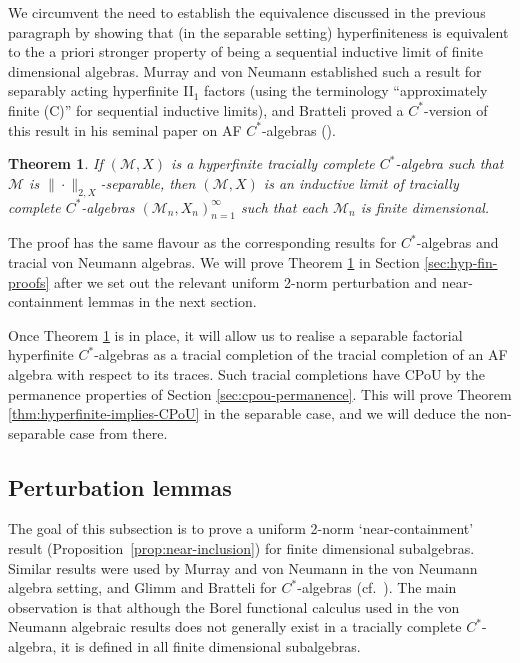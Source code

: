 \documentclass[a4paper,11pt]{amsart}
\newtheorem{theorem}{Theorem}
\theoremstyle{definition}
\numberwithin{equation}{section}
\numberwithin{theorem}{section}
\newcommand{\M}{\mathcal{M}}
\begin{document}
	We circumvent the need to establish the equivalence discussed in the previous paragraph by showing that (in the separable setting) hyperfiniteness is equivalent to the a priori stronger property of being a sequential inductive limit of finite dimensional algebras.  Murray and von Neumann established such a result for separably acting hyperfinite II$_1$ factors (using the terminology ``approximately finite (C)'' for sequential inductive limits), and Bratteli proved a $C^*$-version of this result in his seminal paper on AF $C^*$-algebras (\cite{Bratteli72}).
	
	\begin{theorem}\label{thm:hyperfinite-limit}
		If $(\M, X)$ is a hyperfinite tracially complete $C^*$-algebra such that $\M$ is $\|\cdot\|_{2, X}$-separable, then $(\M, X)$ is an inductive limit of tracially complete $C^*$-algebras $(\M_n, X_n)_{n=1}^\infty$ such that each $\M_n$ is finite dimensional. 
	\end{theorem}
	
	The proof has the same flavour as the corresponding results for $C^*$-algebras and tracial von Neumann algebras.  We will prove Theorem \ref{thm:hyperfinite-limit} in Section \ref{sec:hyp-fin-proofs} after we set out the relevant uniform 2-norm perturbation and near-containment lemmas in the next section.   

Once Theorem \ref{thm:hyperfinite-limit} is in place, it will allow us to realise a separable factorial hyperfinite $C^*$-algebras as a tracial completion of the tracial completion of an AF algebra with respect to its traces.  Such tracial completions have CPoU by the permanence properties of Section \ref{sec:cpou-permanence}. This will prove Theorem \ref{thm:hyperfinite-implies-CPoU} in the separable case, and we will deduce the non-separable case from there. 
	
	
\subsection{Perturbation lemmas}\label{sec:perturbations}



The goal of this subsection is to prove a uniform 2-norm `near-containment' result (Proposition~\ref{prop:near-inclusion}) for finite dimensional subalgebras.  Similar results were used by Murray and von Neumann in the von Neumann algebra setting, and Glimm and Bratteli for $C^*$-algebras (cf.\ \cite{MvN43, Glimm60, Bratteli72}).  The main observation is that although the Borel functional calculus used in the von Neumann algebraic results does not generally exist in a tracially complete $C^*$-algebra, it is defined in all finite dimensional subalgebras.
\end{document}
